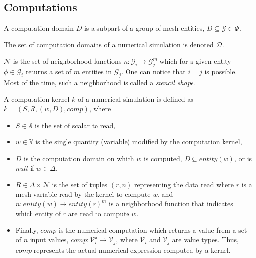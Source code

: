 \subsection{Computations}

\medskip
\begin{mydefs}
\item A computation domain $D$ is a subpart of a group of mesh entities, $D \subseteq \mathcal{G} \in \Phi$.
\item The set of computation domains of a numerical simulation is denoted $\mathcal{D}$.
\item $\mathcal{N}$ is the set of neighborhood functions $n: \mathcal{G}_i \mapsto \mathcal{G}_j^m$ which for a given entity $\phi \in \mathcal{G}_i$ returns a set of $m$ entities in $\mathcal{G}_j$. One can notice that $i = j$ is possible. Most of the time, such a neighborhood is called a \emph{stencil shape}.
\end{mydefs}

\begin{mydef}
A computation kernel $k$ of a numerical simulation is defined as $k=(S,R,(w,D),comp)$, where
\begin{itemize}
\item $S \in \mathcal{S}$ is the set of scalar to read,
\item $w \in \mathbb{V}$ is the single quantity (variable) modified by the computation kernel,
\item $D$ is the computation domain on which $w$ is computed, $D \subseteq entity(w)$, or is $null$ if $w \in \Delta$,
\item $R \in \Delta \times \mathcal{N}$ is the set of tuples $(r,n)$ representing the data read where $r$ is a mesh variable read by the kernel to compute $w$, and $n : entity(w) \rightarrow entity(r)^m$ is a neighborhood function that indicates which entity of $r$ are read to compute $w$.
\item Finally, $comp$ is the numerical computation which returns a value from a set of $n$ input values, $comp: \mathcal{V}_i^n \rightarrow \mathcal{V}_j$, where $\mathcal{V}_i$ and $\mathcal{V}_j$ are value types. Thus, $comp$ represents the actual numerical expression  computed by a kernel.
\end{itemize}
\end{mydef}


